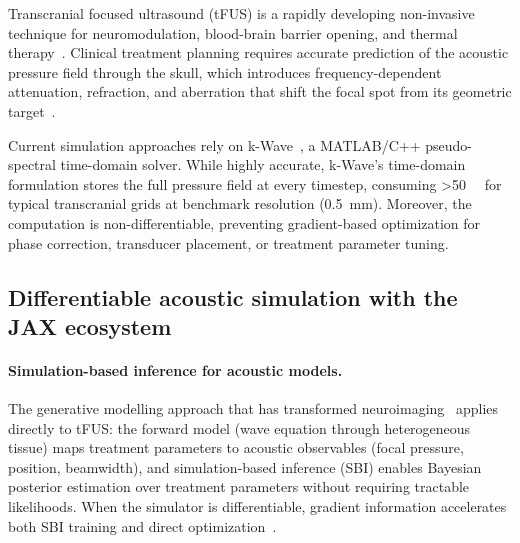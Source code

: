 \documentclass[11pt,a4paper]{article}\usepackage[]{graphicx}\usepackage[]{xcolor}
\begin{document}
Transcranial focused ultrasound (tFUS) is a rapidly developing
non-invasive technique for neuromodulation, blood-brain barrier opening,
and thermal therapy~\citep{Deffieux2013tFUS}. Clinical treatment
planning requires accurate prediction of the acoustic pressure field
through the skull, which introduces frequency-dependent attenuation,
refraction, and aberration that shift the focal spot from its geometric
target~\citep{Aubry2022benchmarks}.

Current simulation approaches rely on k-Wave~\citep{Treeby2010kwave}, a
MATLAB/C++ pseudo-spectral time-domain solver. While highly accurate,
k-Wave's time-domain formulation stores the full pressure field at every
timestep, consuming \SI{>50}{\giga\byte} for typical transcranial grids
at benchmark resolution (\SI{0.5}{\milli\metre}). Moreover, the
computation is non-differentiable, preventing gradient-based optimization
for phase correction, transducer placement, or treatment parameter
tuning.

\subsection{Differentiable acoustic simulation with the JAX ecosystem}

\paragraph{Simulation-based inference for acoustic models.}
The generative modelling approach that has transformed
neuroimaging~\citep{Cranmer2020sbi} applies directly to tFUS: the
forward model (wave equation through heterogeneous tissue) maps
treatment parameters to acoustic observables (focal pressure, position,
beamwidth), and simulation-based inference (SBI) enables Bayesian
posterior estimation over treatment parameters without requiring
tractable likelihoods. When the simulator is differentiable, gradient
information accelerates both SBI training and direct
optimization~\citep{Hermans2020sbi_nre}.
\end{document}
